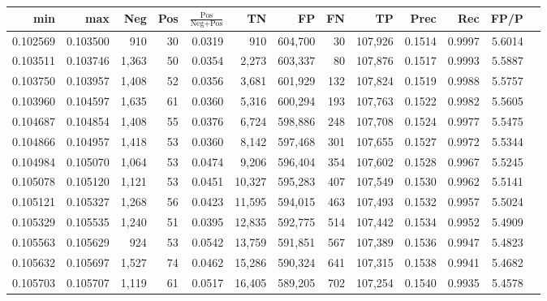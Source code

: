 \begin{tabular}{rrrrrrrrrrrrr}
\toprule
     min &      max &   Neg & Pos & $\frac{\text{Pos}}{\text{Neg}+\text{Pos}}$ &      TN &      FP &      FN &      TP &   Prec &    Rec &   FP/P \\
\midrule
0.102569 & 0.103500 &   910 &  30 &                                     0.0319 &     910 & 604,700 &      30 & 107,926 & 0.1514 & 0.9997 & 5.6014 \\
0.103511 & 0.103746 & 1,363 &  50 &                                     0.0354 &   2,273 & 603,337 &      80 & 107,876 & 0.1517 & 0.9993 & 5.5887 \\
0.103750 & 0.103957 & 1,408 &  52 &                                     0.0356 &   3,681 & 601,929 &     132 & 107,824 & 0.1519 & 0.9988 & 5.5757 \\
0.103960 & 0.104597 & 1,635 &  61 &                                     0.0360 &   5,316 & 600,294 &     193 & 107,763 & 0.1522 & 0.9982 & 5.5605 \\
0.104687 & 0.104854 & 1,408 &  55 &                                     0.0376 &   6,724 & 598,886 &     248 & 107,708 & 0.1524 & 0.9977 & 5.5475 \\
0.104866 & 0.104957 & 1,418 &  53 &                                     0.0360 &   8,142 & 597,468 &     301 & 107,655 & 0.1527 & 0.9972 & 5.5344 \\
0.104984 & 0.105070 & 1,064 &  53 &                                     0.0474 &   9,206 & 596,404 &     354 & 107,602 & 0.1528 & 0.9967 & 5.5245 \\
0.105078 & 0.105120 & 1,121 &  53 &                                     0.0451 &  10,327 & 595,283 &     407 & 107,549 & 0.1530 & 0.9962 & 5.5141 \\
0.105121 & 0.105327 & 1,268 &  56 &                                     0.0423 &  11,595 & 594,015 &     463 & 107,493 & 0.1532 & 0.9957 & 5.5024 \\
0.105329 & 0.105535 & 1,240 &  51 &                                     0.0395 &  12,835 & 592,775 &     514 & 107,442 & 0.1534 & 0.9952 & 5.4909 \\
0.105563 & 0.105629 &   924 &  53 &                                     0.0542 &  13,759 & 591,851 &     567 & 107,389 & 0.1536 & 0.9947 & 5.4823 \\
0.105632 & 0.105697 & 1,527 &  74 &                                     0.0462 &  15,286 & 590,324 &     641 & 107,315 & 0.1538 & 0.9941 & 5.4682 \\
0.105703 & 0.105707 & 1,119 &  61 &                                     0.0517 &  16,405 & 589,205 &     702 & 107,254 & 0.1540 & 0.9935 & 5.4578 \\

\end{tabular}
